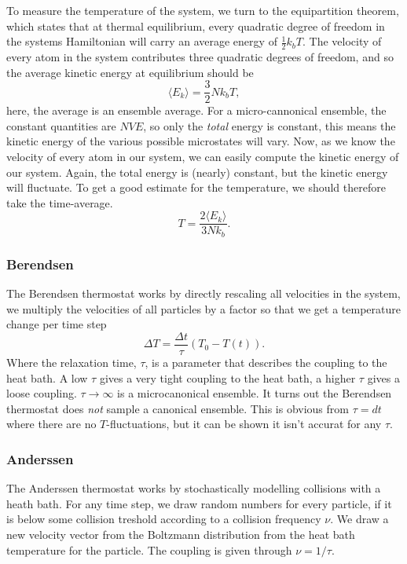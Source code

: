 \documentclass[a4paper, 11pt, notitlepage, english]{article}
\begin{document}
To measure the temperature of the system, we turn to the equipartition theorem, which states that at thermal equilibrium, every quadratic degree of freedom in the systems Hamiltonian will carry an average energy of $\frac{1}{2}k_b T$. The velocity of every atom in the system contributes three quadratic degrees of freedom, and so the average kinetic energy at equilibrium should be
$$\langle E_k \rangle = \frac{3}{2}N k_b T,$$
here, the average is an ensemble average. For a micro-cannonical ensemble, the constant quantities are $NVE$, so only the \emph{total} energy is constant, this means the kinetic energy of the various possible microstates will vary. Now, as we know the velocity of every atom in our system, we can easily compute the kinetic energy of our system. Again, the total energy is (nearly) constant, but the kinetic energy will fluctuate. To get a good estimate for the temperature, we should therefore take the time-average.
$$T = \frac{2\langle E_k \rangle}{3Nk_b}.$$

\subsubsection*{Berendsen}

The Berendsen thermostat works by directly rescaling all velocities in the system, we multiply the velocities of all particles by a factor so that we get a temperature change per time step
$$\Delta T = \frac{\Delta t}{\tau}(T_0 - T(t)).$$
Where the relaxation time, $\tau$, is a parameter that describes the coupling to the heat bath. A low $\tau$ gives a very tight coupling to the heat bath, a higher $\tau$ gives a loose coupling. $\tau \to \infty$ is a microcanonical ensemble. It turns out the Berendsen thermostat does \emph{not} sample a canonical ensemble. This is obvious from $\tau = dt$ where there are no $T$-fluctuations, but it can be shown it isn't accurat for any $\tau$.

\subsubsection*{Anderssen}

The Anderssen thermostat works by stochastically modelling collisions with a heath bath. For any time step, we draw random numbers for every particle, if it is below some collision treshold according to a collision frequency $\nu$. We draw a new velocity vector from the Boltzmann distribution from the heat bath temperature for the particle. The coupling is given through $\nu = 1/\tau$.
\end{document}
